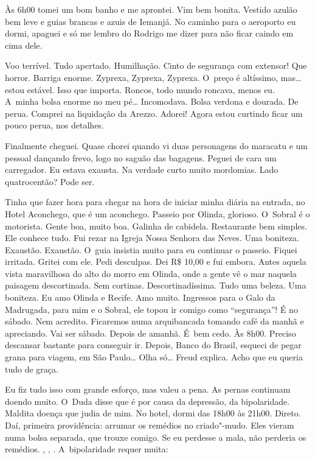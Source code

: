 Às 6h00 tomei um bom banho e me aprontei. Vim bem bonita. Vestido azulão
bem leve e guias brancas e azuis de Iemanjá. No caminho para o aeroporto
eu dormi, apaguei e só me lembro do Rodrigo me dizer para não ficar
caindo em cima dele.

Voo terrível. Tudo apertado. Humilhação. Cinto de segurança com
extensor! Que horror. Barriga enorme. Zyprexa, Zyprexa, Zyprexa. O~preço é altíssimo, mas… estou estável. Isso que importa. Roncos,
todo mundo roncava, menos eu. A~minha bolsa enorme no meu pé…
Incomodava. Bolsa verdona e dourada. De perua. Comprei na liquidação da
Arezzo. Adorei! Agora estou curtindo ficar um pouco perua, nos detalhes.

Finalmente cheguei. Quase chorei quando vi duas personagens do maracatu
e um pessoal dançando frevo, logo no saguão das bagagens. Peguei de cara
um carregador. Eu estava exausta. Na verdade curto muito mordomias. Lado
quatrocentão? Pode ser.

Tinha que fazer hora para chegar na hora de iniciar minha diária na
entrada, no Hotel Aconchego, que é um aconchego. Passeio por Olinda,
glorioso. O~Sobral é o motorista. Gente boa, muito boa. Galinha de
cabidela. Restaurante bem simples. Ele conhece tudo. Fui rezar na Igreja
Nossa Senhora das Neves. Uma boniteza. Exaustão. Exaustão. O~guia
insistia muito para eu continuar o passeio. Fiquei irritada. Gritei com
ele. Pedi desculpas. Dei R\$ 10,00 e fui embora. Antes aquela vista
maravilhosa do alto do morro em Olinda, onde a gente vê o mar naquela
paisagem descortinada. Sem cortinas. Descortinadíssima. Tudo uma beleza.
Uma boniteza. Eu amo Olinda e Recife. Amo muito. Ingressos para o Galo
da Madrugada, para mim e o Sobral, ele topou ir comigo como
``segurança''! É no sábado. Nem acredito. Ficaremos numa arquibancada
tomando café da manhã e apreciando. Vai ser sábado. Depois de amanhã. É~bem cedo. Às 8h00. Preciso descansar bastante para conseguir ir. Depois,
Banco do Brasil, esqueci de pegar grana para viagem, em São
Paulo… Olha só… Freud explica. Acho que eu queria tudo de
graça.

Eu fiz tudo isso com grande esforço, mas valeu a pena. As pernas
continuam doendo muito. O~Duda disse que é por causa da depressão, da
bipolaridade. Maldita doença que judia de mim. No hotel, dormi das 18h00
às 21h00. Direto. Daí, primeira providência: arrumar os remédios no
criado"-mudo. Eles vieram numa bolsa separada, que trouxe comigo. Se eu
perdesse a mala, não perderia os remédios. , ,
. A~bipolaridade requer muita:

